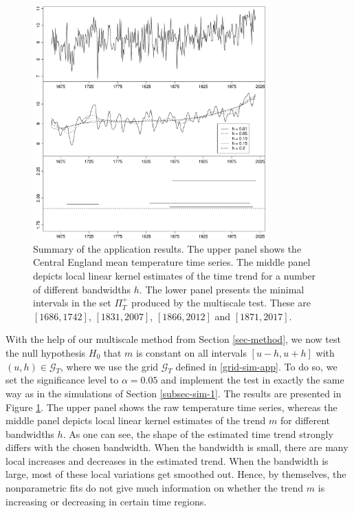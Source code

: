 \begin{figure}[t]
\centering
\includegraphics[width=0.8\textwidth]{Plots/temperature_data.pdf}
\caption{Summary of the application results. The upper panel shows the Central England mean temperature time series. The middle panel depicts local linear kernel estimates of the time trend for a number of different bandwidths $h$. The lower panel presents the minimal intervals in the set $\Pi_T^+$ produced by the multiscale test. These are $[1686,1742]$, $[1831,2007]$, $[1866, 2012]$ and $[1871,2017]$.}\label{plot-results-app1}
\end{figure}


With the help of our multiscale method from Section \ref{sec-method}, we now test the null hypothesis $H_0$ that $m$ is constant on all intervals $[u-h,u+h]$ with $(u,h) \in \mathcal{G}_T$, where we use the grid $\mathcal{G}_T$ defined in \eqref{grid-sim-app}. To do so, we set the significance level to $\alpha = 0.05$ and implement the test in exactly the same way as in the simulations of Section \ref{subsec-sim-1}. The results are presented in Figure \ref{plot-results-app1}. The upper panel shows the raw temperature time series, whereas the middle panel depicts local linear kernel estimates of the trend $m$ for different bandwidths $h$. As one can see, the shape of the estimated time trend strongly differs with the chosen bandwidth. When the bandwidth is small, there are many local increases and decreases in the estimated trend. When the bandwidth is large, most of these local variations get smoothed out. Hence, by themselves, the nonparametric fits do not give much information on whether the trend $m$ is increasing or decreasing in certain time regions. 


